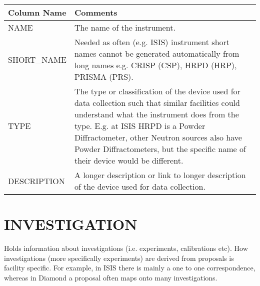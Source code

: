 \documentclass{report}
\begin{document}
\begin{tabular}{|l|l|}
\hline
Column Name & Comments \\ \hline
NAME & \multicolumn{1}{p{100mm}|}{
The name of the instrument.} \\ \hline
SHORT\_NAME & \multicolumn{1}{p{100mm}|}{
Needed as often (e.g. ISIS)  instrument short names cannot be generated automatically from long names e.g. CRISP (CSP), HRPD (HRP), PRISMA (PRS).} \\ \hline
TYPE & \multicolumn{1}{p{100mm}|}{
The type or classification of the device used for data collection such that similar facilities could understand what the instrument does from the type. E.g. at ISIS HRPD is a Powder Diffractometer, other Neutron sources also have Powder Diffractometers, but the specific name of their device would be different.} \\ \hline
DESCRIPTION & \multicolumn{1}{p{100mm}|}{
A longer description or link to longer description of the device used for data collection.} \\ \hline
\end{tabular}
\section{INVESTIGATION}

Holds information about investigations (i.e. experiments, calibrations etc). How investigations (more specifically experiments) are derived from proposals is facility specific. For example, in ISIS there is mainly a one to one correspondence, whereas in Diamond a proposal often maps onto many investigations.\\
\end{document}
